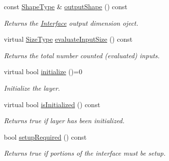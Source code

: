 \begin{DoxyCompactItemize}
const \hyperlink{classffnn_1_1layer_1_1internal_1_1_interface_a945709b1d0ea54a51539b80d04485f5f}{Shape\-Type} \& \hyperlink{classffnn_1_1layer_1_1internal_1_1_interface_a05233a4b8e763ea17c58f45c480add35}{output\-Shape} () const 
\begin{DoxyCompactList}\small\item\em Returns the \hyperlink{classffnn_1_1layer_1_1internal_1_1_interface}{Interface} output dimension oject. \end{DoxyCompactList}\item 
virtual \hyperlink{classffnn_1_1layer_1_1internal_1_1_interface_af0567642f60c65b5e87067226a54174b}{Size\-Type} \hyperlink{classffnn_1_1layer_1_1internal_1_1_interface_aae590ebe90408887805743c5e364dd45}{evaluate\-Input\-Size} () const 
\begin{DoxyCompactList}\small\item\em Returns the total number counted (evaluated) inputs. \end{DoxyCompactList}\item 
virtual bool \hyperlink{classffnn_1_1layer_1_1internal_1_1_interface_a4159d9d163a0bd5287cc02c91b5baba8}{initialize} ()=0
\begin{DoxyCompactList}\small\item\em Initialize the layer. \end{DoxyCompactList}\item 
virtual bool \hyperlink{classffnn_1_1layer_1_1internal_1_1_interface_a67cf9f89a90eadca6f9ec82dd66bd940}{is\-Initialized} () const 
\begin{DoxyCompactList}\small\item\em Returns true if layer has been initialized. \end{DoxyCompactList}\item 
bool \hyperlink{classffnn_1_1layer_1_1internal_1_1_interface_a6e7c83f8328e5c5f49fdba28abfba7c1}{setup\-Required} () const 
\begin{DoxyCompactList}\small\item\em Returns true if portions of the interface must be setup. \end{DoxyCompactList}\end{DoxyCompactItemize}
